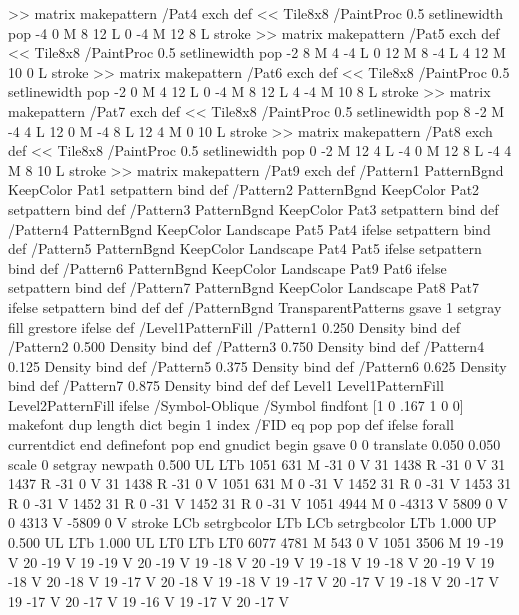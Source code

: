 {{{>> matrix makepattern
/Pat4 exch def
<< Tile8x8
 /PaintProc {0.5 setlinewidth pop -4 0 M 8 12 L
	0 -4 M 12 8 L stroke}
>> matrix makepattern
/Pat5 exch def
<< Tile8x8
 /PaintProc {0.5 setlinewidth pop -2 8 M 4 -4 L
	0 12 M 8 -4 L 4 12 M 10 0 L stroke}
>> matrix makepattern
/Pat6 exch def
<< Tile8x8
 /PaintProc {0.5 setlinewidth pop -2 0 M 4 12 L
	0 -4 M 8 12 L 4 -4 M 10 8 L stroke}
>> matrix makepattern
/Pat7 exch def
<< Tile8x8
 /PaintProc {0.5 setlinewidth pop 8 -2 M -4 4 L
	12 0 M -4 8 L 12 4 M 0 10 L stroke}
>> matrix makepattern
/Pat8 exch def
<< Tile8x8
 /PaintProc {0.5 setlinewidth pop 0 -2 M 12 4 L
	-4 0 M 12 8 L -4 4 M 8 10 L stroke}
>> matrix makepattern
/Pat9 exch def
/Pattern1 {PatternBgnd KeepColor Pat1 setpattern} bind def
/Pattern2 {PatternBgnd KeepColor Pat2 setpattern} bind def
/Pattern3 {PatternBgnd KeepColor Pat3 setpattern} bind def
/Pattern4 {PatternBgnd KeepColor Landscape {Pat5} {Pat4} ifelse setpattern} bind def
/Pattern5 {PatternBgnd KeepColor Landscape {Pat4} {Pat5} ifelse setpattern} bind def
/Pattern6 {PatternBgnd KeepColor Landscape {Pat9} {Pat6} ifelse setpattern} bind def
/Pattern7 {PatternBgnd KeepColor Landscape {Pat8} {Pat7} ifelse setpattern} bind def
} def
%
%
%
/PatternBgnd {
  TransparentPatterns {} {gsave 1 setgray fill grestore} ifelse
} def
%
%
/Level1PatternFill {
/Pattern1 {0.250 Density} bind def
/Pattern2 {0.500 Density} bind def
/Pattern3 {0.750 Density} bind def
/Pattern4 {0.125 Density} bind def
/Pattern5 {0.375 Density} bind def
/Pattern6 {0.625 Density} bind def
/Pattern7 {0.875 Density} bind def
} def
%
%
Level1 {Level1PatternFill} {Level2PatternFill} ifelse
%
/Symbol-Oblique /Symbol findfont [1 0 .167 1 0 0] makefont
dup length dict begin {1 index /FID eq {pop pop} {def} ifelse} forall
currentdict end definefont pop
end
gnudict begin
gsave
0 0 translate
0.050 0.050 scale
0 setgray
newpath
0.500 UL
LTb
1051 631 M
-31 0 V
31 1438 R
-31 0 V
31 1437 R
-31 0 V
31 1438 R
-31 0 V
1051 631 M
0 -31 V
1452 31 R
0 -31 V
1453 31 R
0 -31 V
1452 31 R
0 -31 V
1452 31 R
0 -31 V
1051 4944 M
0 -4313 V
5809 0 V
0 4313 V
-5809 0 V
stroke
LCb setrgbcolor
LTb
LCb setrgbcolor
LTb
1.000 UP
0.500 UL
LTb
1.000 UL
LT0
LTb
LT0
6077 4781 M
543 0 V
1051 3506 M
19 -19 V
20 -19 V
19 -19 V
20 -19 V
19 -18 V
20 -19 V
19 -18 V
19 -18 V
20 -19 V
19 -18 V
20 -18 V
19 -17 V
20 -18 V
19 -18 V
19 -17 V
20 -17 V
19 -18 V
20 -17 V
19 -17 V
20 -17 V
19 -16 V
19 -17 V
20 -17 V
}}
